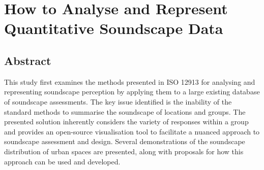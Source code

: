\chapter{How to Analyse and Represent Quantitative Soundscape Data}\label{ch:circumplex}

\section{Abstract}
This study first examines the methods presented in ISO 12913 for analysing and representing soundscape perception by applying them to a large existing database of soundscape assessments. The key issue identified is the inability of the standard methods to summarise the soundscape of locations and groups. The presented solution inherently considers the variety of responses within a group and provides an open-source visualisation tool to facilitate a nuanced approach to soundscape assessment and design. Several demonstrations of the soundscape distribution of urban spaces are presented, along with proposals for how this approach can be used and developed.

